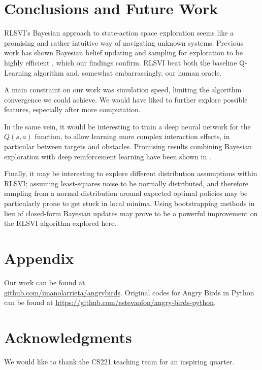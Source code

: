 \documentclass[fleqn,10pt]{SelfArx} %
\begin{document}
\section{Conclusions and Future Work}

RLSVI's Bayesian approach to state-action space exploration seems like a promising and rather intuitive way of navigating unknown systems. Previous work has shown Bayesian belief updating and sampling for exploration to be highly efficient \cite{osband2013more}, which our findings confirm. RLSVI beat both the baseline Q-Learning algorithm and, somewhat embarrassingly, our human oracle.

A main constraint on our work was simulation speed, limiting the algorithm convergence we could achieve. We would have liked to further explore possible features, especially after more computation. 

In the same vein, it would be interesting to train a deep neural network for the $Q(s,a)$ function, to allow learning more complex interaction effects, in particular between targets and obstacles. Promising results combining Bayesian exploration with deep reinforcement learning have been shown in \cite{osband2015bootstrapped}.

Finally, it may be interesting to explore different distribution assumptions within RLSVI; assuming least-squares noise to be normally distributed, and therefore sampling from a normal distribution around expected optimal policies may be particularly prone to get stuck in local minima. Using bootstrapping methods in lieu of closed-form Bayesian updates may prove to be a powerful improvement on the RLSVI algorithm explored here.

\section*{Appendix} %
Our work can be found at \\ \url{github.com/imanolarrieta/angrybirds}. Original codes for Angry Birds in Python can be found at \url{https://github.com/estevaofon/angry-birds-python}.

\section*{Acknowledgments} %
We would like to thank the CS221 teaching team for an inspiring quarter.
\end{document}
